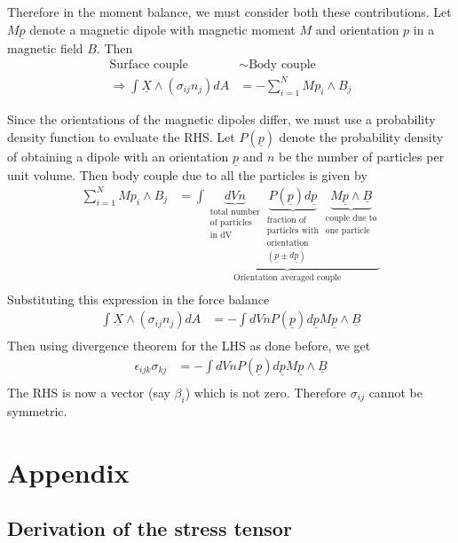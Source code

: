 \documentclass[11pt, letterpaper]{article}
\newcommand{\1}{\textbf{1}}
\newcommand{\vect}[1]{\underline{#1}} %
\begin{document}
Therefore in the moment balance, we must consider both these contributions. Let $M\vect p$ denote a magnetic dipole with magnetic moment $M$ and orientation $p$ in a magnetic field $B$. Then
\begin{align*}
\text{Surface couple} &\sim \text{Body couple}\\
\Rightarrow \int\vect X \wedge (\sigma_{ij}n_j)  dA &= -\sum_{i=1}^N Mp_i \wedge B_j
\end{align*}

Since the orientations of the magnetic dipoles differ, we must use a probability density function to evaluate the RHS. Let $P(\vect p)$ denote the probability density of obtaining a dipole with an orientation $\vect p$ and $n$ be the number of particles per unit volume. Then body couple due to all the particles is given by
\begin{align*}
\sum_{i=1}^N Mp_i \wedge B_j &= \underbrace{\int \underbrace{dV n}_{\substack{\text{total number}\\ \text{of particles}\\ \text{in dV}}} \underbrace{P(\vect p)d\vect p}_{\substack{\text{fraction of}\\ \text{particles with}\\ \text{orientation}\\ \text{$(\vect p \pm d\vect p)$}}} \underbrace{M\vect p \wedge \vect B}_{\substack{\text{couple due to}\\ \text{one particle}}}}_{\text{Orientation averaged couple}} \\
\end{align*}
Substituting this expression in the force balance
\begin{align*}
\int\vect X \wedge (\sigma_{ij}n_j)  dA &= -\int dV n P(\vect p) d\vect p M\vect p \wedge \vect B\\
\end{align*}
Then using divergence theorem for the LHS as done before, we get
\begin{align*}
\epsilon_{ijk}\sigma_{kj} &= -\int dV n P(\vect p) d\vect p M\vect p \wedge \vect B\\
\end{align*}
The RHS is now a vector (say $\beta_i$) which is not zero. Therefore $\sigma_{ij}$ cannot be symmetric.
\section*{Appendix}
\subsection{Derivation of the stress tensor}
\end{document}
